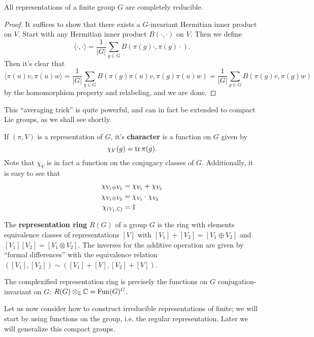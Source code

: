 \documentclass{../mathnotes}
\begin{document}
\begin{cor}
    All representations of a finite group $G$ are completely reducible.
\end{cor}
\begin{proof}
    It suffices to show that there exists a $G$-invariant Hermitian inner product on $V$. Start with any Hermitian inner product $B(\cdot,\cdot)$ on $V$. 
    Then we define
    \[\langle\cdot,\cdot\rangle=\frac{1}{|G|}\sum_{g\in G}B(\pi(g)\cdot,\pi(g)\cdot).\]
    Then it's clear that 
    \[\langle\pi(u)v,\pi(u)w\rangle=\frac{1}{|G|}\sum_{g\in G}B(\pi(g)\pi(u)v,\pi(g)\pi(u)w)=\frac{1}{|G|}\sum_{g\in G}B(\pi(g)v,\pi(g)w)\]
    by the homomorphism property and relabeling, and we are done.
\end{proof}

This ``averaging trick'' is quite powerful, and can in fact be extended to compact Lie groups, as we shall see shortly.

\begin{defn}
    If $(\pi,V)$ is a representation of $G$, it's \textbf{character} is a function on $G$ given by
    \[\chi_V(g)=\operatorname{tr} \pi(g).\]
    Note that $\chi_V$ is in fact a function on the conjugacy classes of $G$. Additionally, it is easy to see that
    \begin{align*}
        \chi_{V_1\oplus V_2}&=\chi_{V_1}+\chi_{V_2}\\
        \chi_{V_1\otimes V_2}&=\chi_{V_1}\cdot\chi_{V_2}\\
        \chi_{(V_1,\mathbb{C})}&=1
    \end{align*}
\end{defn}

\begin{defn}
    The \textbf{representation ring} $R(G)$ of a group $G$ is the ring with elements equivalence classes of representations $[V]$
    with $[V_1]+[V_2]=[V_1\oplus V_2]$ and $[V_1][V_2]=[V_1\otimes V_2]$. The inverses for the additive operation are given by ``formal
    differences'' with the equivalence relation $([V_1],[V_2])\sim([V_1]+[V],[V_2]+[V])$.
\end{defn}

\begin{lem}
    The complexified representation ring is precisely the functions on $G$ conjugation-invariant on $G$: $R(G)\otimes_{\mathbb{Z}}\mathbb{C}=\text{Fun}(G)^G$.
\end{lem}

Let us now consider how to construct irreducible representations of finite; we will start by using functions on the group, i.e. the regular representation.
Later we will generalize this compact groups.
\end{document}

